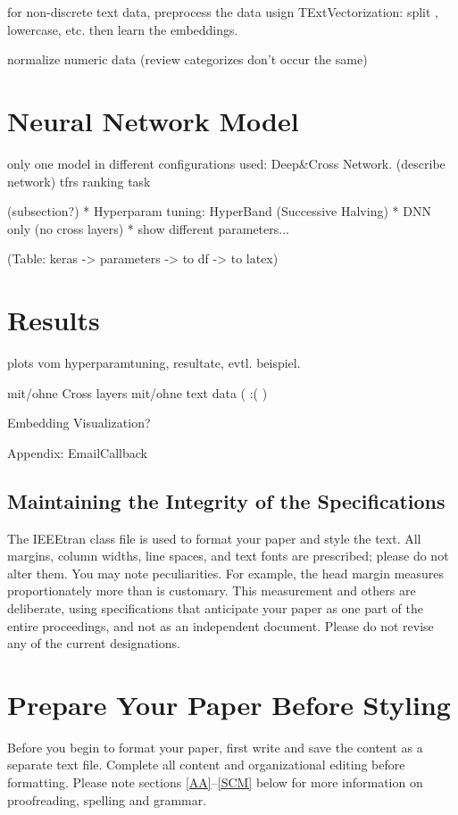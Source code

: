 \documentclass[10pt,draft,journal,a4paper,oneside,twocolumn]{IEEEtran}
\begin{document}
for non-discrete text data, preprocess the data usign TExtVectorization: split , lowercase, etc. then learn the embeddings.

normalize numeric data (review categorizes don't occur the same)

\section{Neural Network Model}
only one model in different configurations used: Deep\&Cross Network.
(describe network)
tfrs ranking task

(subsection?)
* Hyperparam tuning: HyperBand (Successive Halving)
* DNN only (no cross layers)
* show different parameters...

(Table: keras -> parameters -> to df -> to latex)


\section{Results}
plots vom hyperparamtuning, resultate, evtl. beispiel.

mit/ohne Cross layers
mit/ohne text data ( :( )

Embedding Visualization?

Appendix: EmailCallback


\subsection{Maintaining the Integrity of the Specifications}

The IEEEtran class file is used to format your paper and style the text. All margins, 
column widths, line spaces, and text fonts are prescribed; please do not 
alter them. You may note peculiarities. For example, the head margin
measures proportionately more than is customary. This measurement 
and others are deliberate, using specifications that anticipate your paper 
as one part of the entire proceedings, and not as an independent document. 
Please do not revise any of the current designations.

\section{Prepare Your Paper Before Styling}
Before you begin to format your paper, first write and save the content as a 
separate text file. Complete all content and organizational editing before 
formatting. Please note sections \ref{AA}--\ref{SCM} below for more information on 
proofreading, spelling and grammar.
\end{document}
